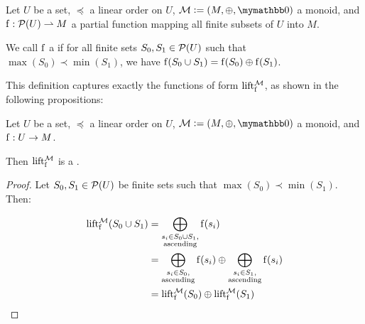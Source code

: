 \documentclass[conference]{IEEEtran}
\begin{document}
\begin{definition}
	Let $U$ be a set, $\preceq$ a linear order on $U$, $\mathcal{M} \defeq (M, \groupaddsym, \neutraladd)$ a monoid, and ${\operatorname{f}}: {\mathcal{P}({U})} \rightharpoonup{M}$ a partial function mapping all finite subsets of $U$ into $M$.
	
	We call $\operatorname{f}$ a  if for all finite sets $S_0, S_1 \in \mathcal{P}({U})$ such that $\max(S_0) \prec \min(S_1)$, we have $\operatorname{f}(S_0 \cup S_1) = {\operatorname{f}(S_0)} \oplus {\operatorname{f}(S_1)}$.
\end{definition}

This definition captures exactly the functions of form $\operatorname{lift_{\operatorname{f}}^{\mathcal{M}}}$, as shown in the following propositions:

\begin{proposition}
Let $U$ be a set, $\preceq$ a linear order on $U$, $\mathcal{M} \defeq (M, \groupaddsym, \neutraladd)$ a monoid, and ${\operatorname{f}}: {U} \rightarrow {M}$.

Then $\operatorname{lift_{\operatorname{f}}^{\mathcal{M}}}$ is a \somewhatmorphism{}.

\begin{proof}
Let $S_0, S_1 \in \mathcal{P}({U})$ be finite sets such that $\max(S_0) \prec \min(S_1)$. Then:

\begin{align*}
\operatorname{lift_{\operatorname{f}}^{\mathcal{M}}}(S_0 \cup S_1) &= \bigoplus_{\substack{s_i \in S_0 \cup S_1,\\ \text{ascending}}} \operatorname{f}(s_i)\\
&= \bigoplus_{\substack{s_i \in S_0,\\ \text{ascending}}} \operatorname{f}(s_i) \oplus \bigoplus_{\substack{s_i \in S_1,\\ \text{ascending}}} \operatorname{f}(s_i)\\
&= \operatorname{lift_{\operatorname{f}}^{\mathcal{M}}}(S_0) \oplus \operatorname{lift_{\operatorname{f}}^{\mathcal{M}}}(S_1)\\
\end{align*}
\end{proof}
\end{proposition}
\end{document}
